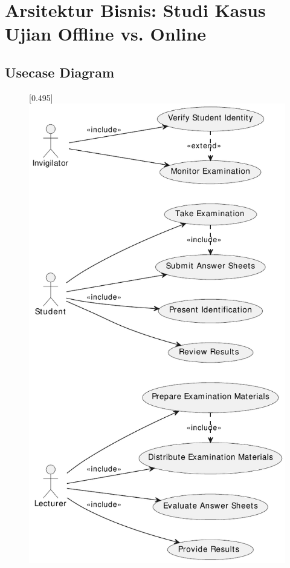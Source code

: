 \section{Arsitektur Bisnis: Studi Kasus Ujian Offline vs. Online}

\subsection{Usecase Diagram}

\begin{figure}[h!]
	\centering
	[0.495\linewidth]{\includegraphics[width=\linewidth]{../figures/usecase_offline_exam}}

\end{figure}
